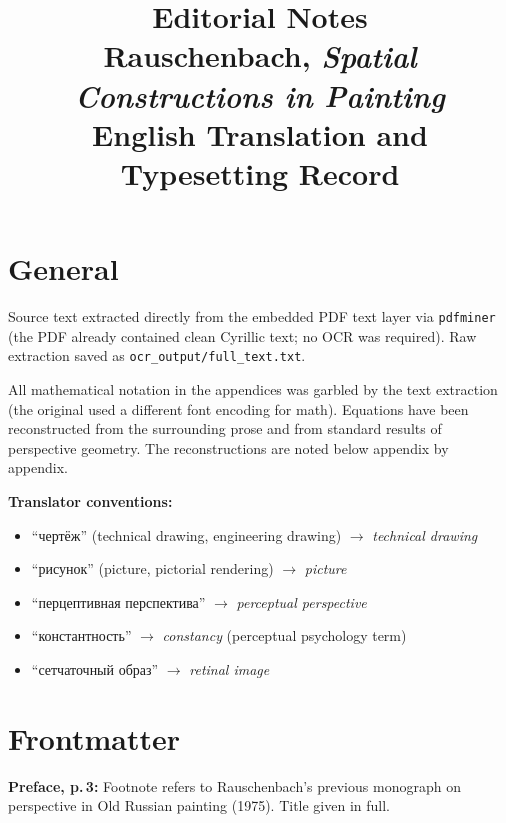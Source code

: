 \documentclass[12pt]{article}
\begin{document}
\title{Editorial Notes\\[0.5ex]
  \large Rauschenbach, \emph{Spatial Constructions in Painting}\\
  English Translation and Typesetting Record}
\date{}
\maketitle

\section*{General}

Source text extracted directly from the embedded PDF text layer via
\texttt{pdfminer} (the PDF already contained clean Cyrillic text; no OCR was
required). Raw extraction saved as \texttt{ocr\_output/full\_text.txt}.

All mathematical notation in the appendices was garbled by the text extraction
(the original used a different font encoding for math). Equations have been
reconstructed from the surrounding prose and from standard results of
perspective geometry. The reconstructions are noted below appendix by appendix.

\bigskip
\noindent\textbf{Translator conventions:}
\begin{itemize}
  \item ``\foreignlanguage{russian}{чертёж}'' (technical drawing, engineering drawing) $\to$ \emph{technical drawing}
  \item ``\foreignlanguage{russian}{рисунок}'' (picture, pictorial rendering) $\to$ \emph{picture}
  \item ``\foreignlanguage{russian}{перцептивная перспектива}'' $\to$ \emph{perceptual perspective}
  \item ``\foreignlanguage{russian}{константность}'' $\to$ \emph{constancy} (perceptual psychology term)
  \item ``\foreignlanguage{russian}{сетчаточный образ}'' $\to$ \emph{retinal image}
\end{itemize}

\section*{Frontmatter}

\textbf{Preface, p.\,3:} Footnote refers to Rauschenbach's previous monograph
on perspective in Old Russian painting (1975). Title given in full.
\end{document}
